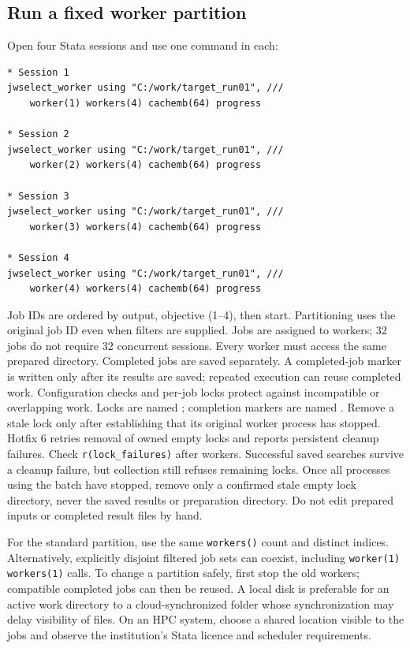 \documentclass[11pt]{article}
\newcommand{\cmd}[1]{\texttt{#1}}
\begin{document}
\subsection{Run a fixed worker partition}
Open four Stata sessions and use one command in each:
\begin{lstlisting}
* Session 1
jwselect_worker using "C:/work/target_run01", ///
    worker(1) workers(4) cachemb(64) progress

* Session 2
jwselect_worker using "C:/work/target_run01", ///
    worker(2) workers(4) cachemb(64) progress

* Session 3
jwselect_worker using "C:/work/target_run01", ///
    worker(3) workers(4) cachemb(64) progress

* Session 4
jwselect_worker using "C:/work/target_run01", ///
    worker(4) workers(4) cachemb(64) progress
\end{lstlisting}
Job IDs are ordered by output, objective (1--4), then start. Partitioning uses
the original job ID even when filters are supplied. Jobs are assigned to
workers; 32 jobs do not require 32 concurrent sessions.
Every worker must access the same prepared directory. Completed jobs are
saved separately. A completed-job marker is written only after its results
are saved; repeated execution can reuse completed work. Configuration checks
and per-job locks protect against incompatible or overlapping work. Locks
are named ; completion markers are named
. Remove a stale lock only after establishing that its original worker
process has stopped. Hotfix 6 retries removal of owned empty locks and
reports persistent cleanup failures. Check \cmd{r(lock\_failures)} after
workers. Successful saved searches survive a cleanup failure, but collection
still refuses remaining locks. Once all processes using the batch have
stopped, remove only a confirmed stale empty lock directory, never the saved
results or preparation directory. Do not edit
prepared inputs or completed result files by hand.

For the standard partition, use the same \cmd{workers()} count and distinct
indices. Alternatively, explicitly disjoint filtered job sets can coexist,
including \cmd{worker(1) workers(1)} calls. To change a partition safely,
first stop the old workers; compatible completed jobs can then be reused. A local disk is preferable for an active work directory to a
cloud-synchronized folder whose synchronization may delay visibility of
files. On an HPC system, choose a shared location visible to the jobs and
observe the institution's Stata licence and scheduler requirements.
\end{document}
